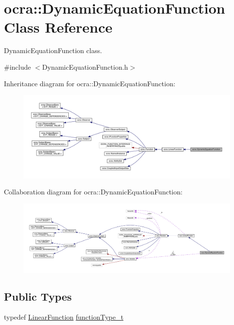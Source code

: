 \hypertarget{classocra_1_1DynamicEquationFunction}{}\section{ocra\+:\+:Dynamic\+Equation\+Function Class Reference}
\label{classocra_1_1DynamicEquationFunction}


Dynamic\+Equation\+Function class.  




{\ttfamily \#include $<$Dynamic\+Equation\+Function.\+h$>$}



Inheritance diagram for ocra\+:\+:Dynamic\+Equation\+Function\+:\nopagebreak
\begin{figure}[H]
\begin{center}
\leavevmode
\includegraphics[width=350pt]{d2/d9b/classocra_1_1DynamicEquationFunction__inherit__graph}
\end{center}
\end{figure}


Collaboration diagram for ocra\+:\+:Dynamic\+Equation\+Function\+:\nopagebreak
\begin{figure}[H]
\begin{center}
\leavevmode
\includegraphics[width=350pt]{df/dbf/classocra_1_1DynamicEquationFunction__coll__graph}
\end{center}
\end{figure}
\subsection*{Public Types}
\begin{DoxyCompactItemize}
\item 
typedef \hyperlink{classocra_1_1LinearFunction}{Linear\+Function} \hyperlink{classocra_1_1DynamicEquationFunction_a2c8c76bfd66285d63895ec34219175b4}{function\+Type\+\_\+t}
\end{DoxyCompactItemize}
